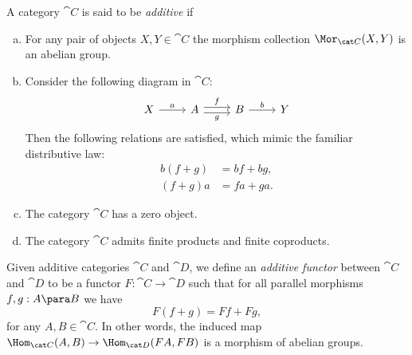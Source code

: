 \begin{definition}
\label{def:additive-category}
A category \(\cat C\) is said to be \emph{additive} if
\begin{enumerate}[(a)]\setlength\itemsep{0em}
\item For any pair of objects \(X, Y \in \cat C\) the morphism collection
  \(\Mor_{\cat C}(X, Y)\) is an abelian group.

\item Consider the following diagram in \(\cat C\):
  \[
  \begin{tikzcd}
  X \ar[r, "a"]
  &A \ar[r, shift left, "f"] \ar[r, shift right, "g"']
  &B \ar[r, "b"]
  &Y
  \end{tikzcd}
  \]
  Then the following relations are satisfied, which mimic the familiar
  distributive law:
  \begin{align*}
    b (f + g) &= b f + b g, \\
    (f + g) a &= f a + g a.
  \end{align*}

\item The category \(\cat C\) has a zero object.

\item The category \(\cat C\) admits finite products and finite coproducts.
\end{enumerate}

Given additive categories \(\cat C\) and \(\cat D\), we define an \emph{additive
  functor} between \(\cat C\) and \(\cat D\) to be a functor
\(F: \cat C \to \cat D\) such that for all parallel morphisms
\(f, g: A \para B\) we have
\[
F(f + g) = F f + F g,
\]
for any \(A, B \in \cat C\). In other words, the induced map
\(\Hom_{\cat C}(A, B) \to \Hom_{\cat D}(F A, F B)\) is a morphism of abelian
groups.
\end{definition}



